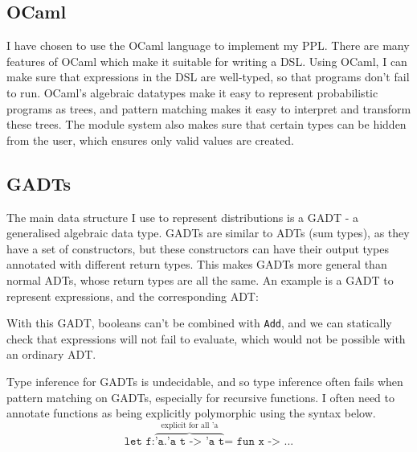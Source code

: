 \documentclass[sigconf]{acmart}
\begin{document}
\subsection{OCaml}
I have chosen to use the OCaml language to implement my PPL. There are many features of OCaml which make it suitable for writing a DSL. Using OCaml, I can make sure that expressions in the DSL are well-typed, so that programs don't fail to run. OCaml's algebraic datatypes make it easy to represent probabilistic programs as trees, and pattern matching makes it easy to interpret and transform these trees. The module system also makes sure that certain types can be hidden from the user, which ensures only valid values are created.

\subsection{GADTs}
The main data structure I use to represent distributions is a GADT - a generalised algebraic data type. GADTs are similar to ADTs (sum types), as they have a set of constructors, but these constructors can have their output types annotated with different return types. This makes GADTs more general than normal ADTs, whose return types are all the same. An example is a GADT to represent expressions, and the corresponding ADT:

\begin{figure*}[!hbt]
  \begin{minipage}{0.45\linewidth}
  \end{minipage}
  \begin{minipage}{0.45\linewidth}
  \end{minipage}
\end{figure*}

With this GADT, booleans can't be combined with \texttt{Add}, and we can statically check that expressions will not fail to evaluate, which would not be possible with an ordinary ADT.

Type inference for GADTs is undecidable, and so type inference often fails when pattern matching on GADTs, especially for recursive functions. I often need to annotate functions as being explicitly polymorphic using the syntax below.
\[
  \texttt{let f:}\overbrace{\texttt{'a.'a t -> 'a t}}^{\text{explicit for all 'a}}\texttt{= fun x -> ...}
\]
\end{document}
